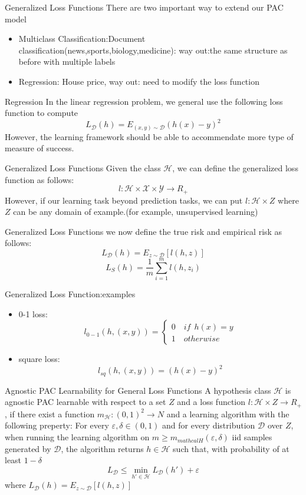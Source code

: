 \documentclass{beamer}
\begin{document}
\begin{frame}{Generalized Loss Functions}
There are two important way to extend our PAC model
\begin{itemize}
	\item Multiclass Classification:Document classification(news,sports,biology,medicine): way out:the same structure as before with multiple labels
	\item Regression: House price, way out: need to modify the loss function
\end{itemize}
\end{frame}
\begin{frame}{Regression}
	In the linear regression problem, we general use the following loss function to compute
	\[L_{\mathcal{D}}(h) = E_{(x,y) \sim \mathcal{D}} (h(x) - y)^2\]
	However, the learning framework should be able to accommendate more type of measure of success.
\end{frame}
\begin{frame}{Generalized Loss Functions}
	Given the class $\mathcal{H}$, we can define the generalized loss function as follows:
	\[l:\mathcal{H} \times \mathcal{X} \times \mathcal{Y} \rightarrow R_+\]
	However, if our learning task beyond prediction tasks, we can put $l: \mathcal{H} \times Z$ where $Z$ can be any domain of example.(for example, unsupervised learning)
\end{frame}
\begin{frame}{Generalized Loss Functions}
	we now define the true risk and empirical risk as follows:
	\[L_{\mathcal{D}} (h) = E_{z \sim \mathcal{D}}[l(h,z)]\]
	\[L_S (h) = \frac{1}{m} \sum^m_{i=1} l(h,z_i)\]
\end{frame}
\begin{frame}{Generalized Loss Function:examples}
	\begin{itemize}
			\item 0-1 loss:
				\[l_{0-1} (h,(x,y)) = \begin{cases}
						0 \quad if \ \ h(x) = y	 \\
						1 \quad otherwise
				\end{cases}\]
			\item square loss:
				\[l_{sq} (h,(x,y)) = (h(x) - y)^2\]
	\end{itemize}
\end{frame}
\begin{frame}{Agnostic PAC Learnability for General Loss Functions}
	A hypothesis class $\mathcal{H}$ is agnostic PAC learnable with respect to a set $Z$ and a loss function $l: \mathcal{H} \times Z \rightarrow R_+$, if there exist a function $m_{\mathcal{H}}:(0,1)^2 \rightarrow N$ and a learning algorithm with the following preperty: For every $\varepsilon,\delta \in (0,1)$ and for every distribution $\mathcal{D}$ over $Z$, when running the learning algorithm on $m \geq m_{mathcal{H}} (\varepsilon,\delta)$ iid samples generated by $\mathcal{D}$, the algorithm returns $h \in \mathcal{H}$ such that, with probability of at least $1- \delta$
	\[L_{\mathcal{D}} \leq \min_{h' \in \mathcal{H}} L_{\mathcal{D}} (h') + \varepsilon\]
	where $L_{\mathcal{D}}(h) = E_{z \sim \mathcal{D}} [l(h,z)]$
\end{frame}
\end{document}
